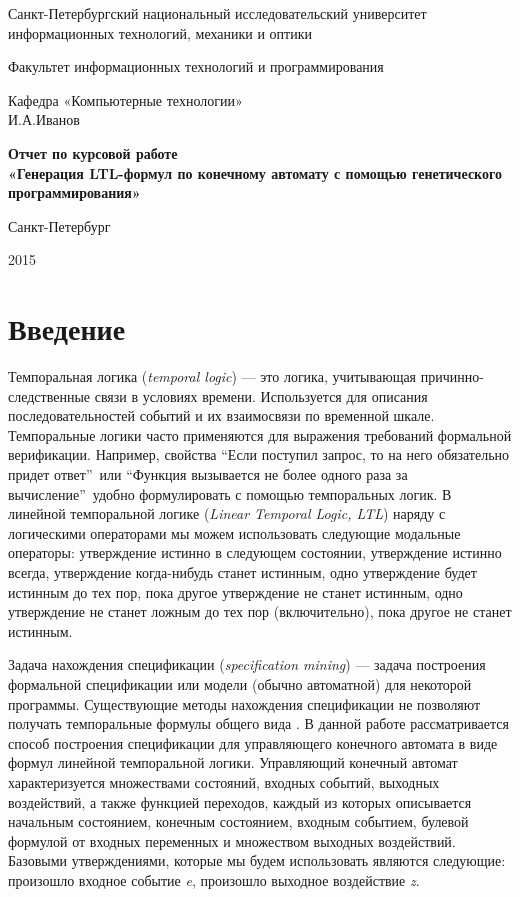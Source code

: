 \documentclass[12pt,fleqn]{article}
\begin{document}
\begin{titlepage}

\begin{center}
{\large
Санкт-Петербургский национальный исследовательский университет информационных технологий, механики и оптики

Факультет информационных технологий и программирования

Кафедра «Компьютерные технологии»\\[3cm]

И.А.Иванов\\[2cm]}

{\large \bfseries
Отчет по курсовой работе\\[0.5cm]

«Генерация LTL-формул по конечному автомату с помощью генетического программирования»
}
\vfill

Санкт-Петербург

2015
\end{center}

\end{titlepage}

\tableofcontents

\section{Введение}

Темпоральная логика (\emph{temporal logic}) \cite{tl} --- это логика, учитывающая причинно-следственные связи в условиях времени.
Используется для описания последовательностей событий и их взаимосвязи по временной шкале.
Темпоральные логики часто применяются для выражения требований формальной верификации.
Например, свойства ``Если поступил запрос, то на него обязательно придет ответ''\ или
``Функция вызывается не более одного раза за вычисление''\ удобно формулировать с помощью темпоральных логик.
В линейной темпоральной логике (\emph{Linear Temporal Logic, LTL}) наряду с логическими операторами мы можем 
использовать следующие модальные операторы: утверждение истинно в следующем состоянии,
утверждение истинно всегда, утверждение когда-нибудь станет истинным,
одно утверждение будет истинным до тех пор, пока другое утверждение не станет истинным,
одно утверждение не станет ложным до тех пор (включительно), пока другое не станет истинным.

Задача нахождения спецификации (\emph{specification mining}) --- задача построения формальной спецификации или модели
(обычно автоматной) для некоторой программы. Существующие методы нахождения спецификации не позволяют получать темпоральные
формулы общего вида \cite{sm1, sm2, sm3, sm4}. В данной работе рассматривается способ построения спецификации
для управляющего конечного автомата в виде формул линейной темпоральной логики.
Управляющий конечный автомат характеризуется множествами состояний, входных событий, выходных воздействий,
а также функцией переходов, каждый из которых описывается начальным состоянием, конечным состоянием,
входным событием, булевой формулой от входных переменных и множеством выходных воздействий.
Базовыми утверждениями, которые мы будем использовать являются следующие: произошло входное событие
\emph{e}, произошло выходное воздействие \emph{z}.
\end{document}
